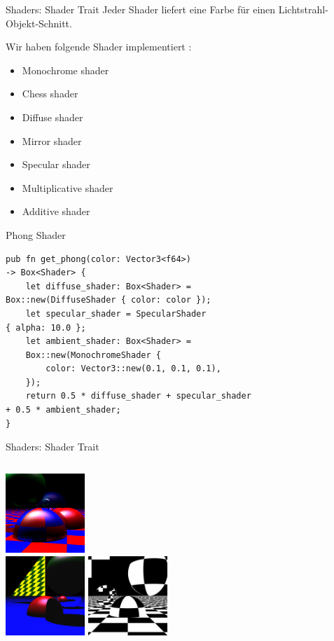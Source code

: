 \documentclass[aspectratio=169]{beamer}
\begin{document}
\begin{frame}[fragile]{Shaders: Shader Trait}
    Jeder Shader liefert eine Farbe für einen Lichtstrahl-Objekt-Schnitt.

    \pause
    Wir haben folgende Shader implementiert :

    \begin{itemize}[<+->]
        \item Monochrome shader
        \item Chess shader
        \item Diffuse shader
        \item Mirror shader
        \item Specular shader
        \item Multiplicative shader
        \item Additive shader
    \end{itemize}
\end{frame}
\begin{frame}[fragile]{Phong Shader}
    \begin{lstlisting}
pub fn get_phong(color: Vector3<f64>)
-> Box<Shader> {
    let diffuse_shader: Box<Shader> =
Box::new(DiffuseShader { color: color });
    let specular_shader = SpecularShader
{ alpha: 10.0 };
    let ambient_shader: Box<Shader> =
    Box::new(MonochromeShader {
        color: Vector3::new(0.1, 0.1, 0.1),
    });
    return 0.5 * diffuse_shader + specular_shader
+ 0.5 * ambient_shader;
}
    \end{lstlisting}
\end{frame}
\begin{frame}{Shaders: Shader Trait}
    \begin{columns}[t]
        \centering
        \includegraphics[height=3cm]{example-true-ambiant} \\
        \includegraphics[height=3cm]{example-mirror}
        \centering
        \includegraphics[height=3cm]{example-mirror2}
    \end{columns}
\end{frame}
\end{document}
